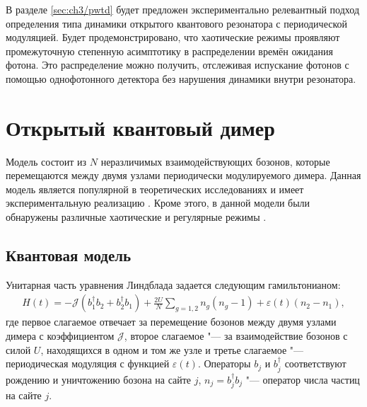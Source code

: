 В разделе \cref{sec:ch3/pwtd} будет предложен экспериментально релевантный подход определения типа динамики открытого квантового резонатора с периодической модуляцией. Будет продемонстрировано, что хаотические режимы проявляют промежуточную степенную асимптотику в распределении времён ожидания фотона. Это распределение можно получить, отслеживая испускание фотонов с помощью однофотонного детектора без нарушения динамики внутри резонатора.

\section{Открытый квантовый димер}\label{sec:ch3/dimer}
Модель состоит из \(N\) неразличимых взаимодействующих бозонов, которые перемещаются между двумя узлами периодически модулируемого димера. 
Данная модель является популярной в теоретических исследованиях \cite{Vardi2001, Trimborn2008, Poletti2012} и имеет экспериментальную реализацию \cite{Gross2010, Tomkovic2017}. Кроме этого, в данной модели были обнаружены различные хаотические и регулярные режимы \cite{Hartmann2017, Ivanchenko2017, Carlo2017, Wang2018}. 

\subsection{Квантовая модель}\label{subsec:ch3/dimer/quantum}

Унитарная часть уравнения Линдблада  задается следующим гамильтонианом:
\begin{equation}
	\label{eq:dimer_H}
	\begin{gathered}
		H(t) = -\mathcal{J} \left(b^\dagger_1 b_2 + b^\dagger_2 b_1\right) + \frac{2 U}{N} \sum_{g=1,2} n_g \left(n_g - 1\right) + \varepsilon(t) \left(n_2 - n_1\right),
	\end{gathered}
\end{equation}
где первое слагаемое отвечает за перемещение бозонов между двумя узлами димера с коэффициентом \(\mathcal{J}\), второе слагаемое "--- за взаимодействие бозонов с силой \(U\), находящихся в  одном и том же узле и третье слагаемое "--- периодическая модуляция с функцией \(\varepsilon(t)\). 
Операторы \(b_j\) и \(b^\dagger_j\) соответствуют рождению и уничтожению бозона на сайте \(j\), \(n_j = b^\dagger_j b_j\) "--- оператор числа частиц на сайте \(j\).

